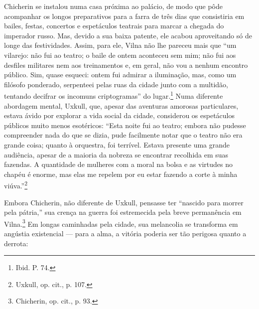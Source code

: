 Chicherin se instalou numa casa próxima ao palácio, de modo que pôde
acompanhar os longos preparativos para a farra de três dias que
consistiria em bailes, festas, concertos e espetáculos teatrais para
marcar a chegada do imperador russo. Mas, devido a sua baixa patente,
ele acabou aproveitando só de longe das festividades. Assim, para ele,
Vilna não lhe pareceu mais que ``um vilarejo: não fui ao teatro; o baile
de ontem aconteceu sem mim; não fui aos desfiles militares nem aos
treinamentos e, em geral, não vou a nenhum encontro público. Sim, quase
esqueci: ontem fui admirar a iluminação, mas, como um filósofo
ponderado, serpenteei pelas ruas da cidade junto com a multidão,
tentando decifrar os incomuns criptogramas'' do lugar.\footnote{Ibid. P. 74.} Numa diferente abordagem mental, Uxkull, que, apesar das aventuras amorosas particulares, estava ávido por explorar a vida social
da cidade, considerou os espetáculos públicos muito menos esotéricos:
``Esta noite fui ao teatro; embora não pudesse compreender nada do que
se dizia, pude facilmente notar que o teatro não era grande coisa;
quanto à orquestra, foi terrível. Estava presente uma grande audiência,
apesar de a maioria da nobreza se encontrar recolhida em suas fazendas.
A quantidade de mulheres com a moral na bolsa e as virtudes no chapéu é
enorme, mas elas me repelem por eu estar fazendo a corte à minha
viúva.''\footnote{Uxkull, op. cit., p. 107.}

Embora Chicherin, não diferente de Uxkull, pensasse ter ``nascido para
morrer pela pátria,'' sua crença na guerra foi estremecida pela breve
permanência em Vilna.\footnote{Chicherin, op. cit., p. 93.} Em longas
caminhadas pela cidade, sua melancolia se transforma em angústia
existencial --- para a alma, a vitória poderia ser tão perigosa quanto a
derrota:

